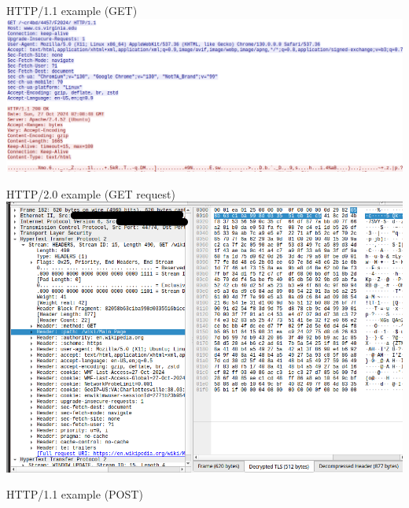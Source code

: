 \begin{frame}{HTTP/1.1 example (GET)}
\includegraphics[width=\textwidth]{../http/http-wireshark-simple}
\end{frame}

\begin{frame}{HTTP/2.0 example (GET request)}
\includegraphics[width=\textwidth]{../http/http2-get-ex}
\end{frame}


\begin{frame}{HTTP/1.1 example (POST)}
\end{frame}

